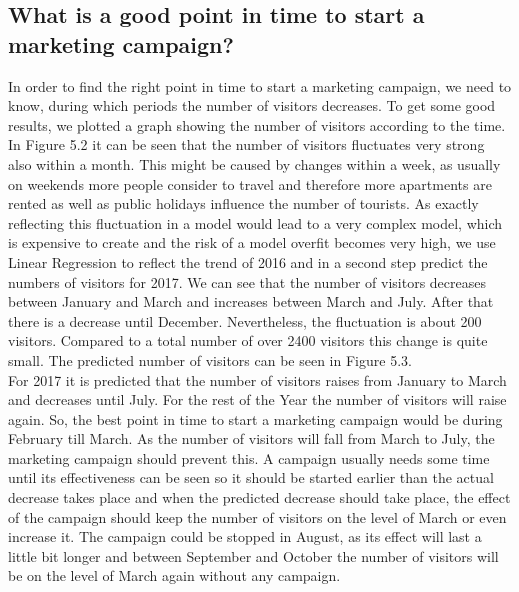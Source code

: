 \documentclass[journal]{IEEEtran}
\begin{document}
\subsection{What is a good point in time to start a marketing campaign?}
\noindent In order to find the right point in time to start a marketing campaign, we need to know, during which periods the number of visitors decreases. To get some good results, we plotted a graph showing the number of visitors according to the time.\\ In Figure 5.2 it can be seen that the number of visitors fluctuates very strong also within a month. This might be caused by changes within a week, as usually on weekends more people consider to travel and therefore more apartments are rented as well as public holidays influence the number of tourists. As exactly reflecting this fluctuation in a model would lead to a very complex model, which is expensive to create and the risk of a model overfit becomes very high, we use Linear Regression to reflect the trend of 2016 and in a second step predict the numbers of visitors for 2017. We can see that the number of visitors decreases between January and March and increases between March and July. After that there is a decrease until December. Nevertheless, the fluctuation is about 200 visitors. Compared to a total number of over 2400 visitors this change is quite small.
The predicted number of visitors can be seen in Figure 5.3.\\ For 2017 it is predicted that the number of visitors raises from January to March and decreases until July. For the rest of the Year the number of visitors will raise again. So, the best point in time to start a marketing campaign would be during February till March. As the number of visitors will fall from March to July, the marketing campaign should prevent this. A campaign usually needs some time until its effectiveness can be seen so it should be started earlier than the actual decrease takes place and when the predicted decrease should take place, the effect of the campaign should keep the number of visitors on the level of March or even increase it. The campaign could be stopped in August, as its effect will last a little bit longer and between September and October the number of visitors will be on the level of March again without any campaign.


%
\end{document}
